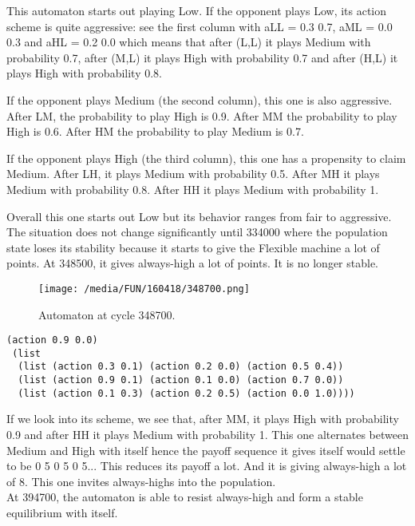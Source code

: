 \documentclass[12.5pt]{report}
\begin{document}
This automaton starts out playing Low. If the opponent plays Low, its action scheme is quite aggressive: see the first column with aLL = 0.3 0.7, aML = 0.0 0.3 and aHL = 0.2 0.0 which means that after (L,L) it plays Medium with probability 0.7, after (M,L) it plays High with probability 0.7 and after (H,L) it plays High with probability 0.8.

If the opponent plays Medium (the second column), this one is also aggressive. After LM, the probability to play High is 0.9. After MM the probability to play High is 0.6. After HM the probability to play Medium is 0.7.

If the opponent plays High (the third column), this one has a propensity to claim Medium. After LH, it plays Medium with probability 0.5. After MH it plays Medium with probability 0.8. After HH it plays Medium with probability 1.

Overall this one starts out Low but its behavior ranges from fair to aggressive.\\



The situation does not change significantly until 334000 where the population state loses its stability because it starts to give the Flexible machine a lot of points. At 348500, it gives always-high a lot of points. It is no longer stable.

\begin{figure}[h!]
\center
\texttt{[image: /media/FUN/160418/348700.png]}
\caption{Automaton at cycle 348700.}
\end{figure}

\begin{verbatim}
(action 0.9 0.0)
 (list
  (list (action 0.3 0.1) (action 0.2 0.0) (action 0.5 0.4))
  (list (action 0.9 0.1) (action 0.1 0.0) (action 0.7 0.0))
  (list (action 0.1 0.3) (action 0.2 0.5) (action 0.0 1.0))))

\end{verbatim}

If we look into its scheme, we see that, after MM, it plays High with probability 0.9 and after HH it plays Medium with probability 1. This one alternates between Medium and High with itself hence the payoff sequence it gives itself would settle to be 0 5 0 5 0 5... This reduces its payoff a lot. And it is giving always-high a lot of 8. This one invites always-highs into the population.\\

At 394700, the automaton is able to resist always-high and form a stable equilibrium with itself.
\end{document}
